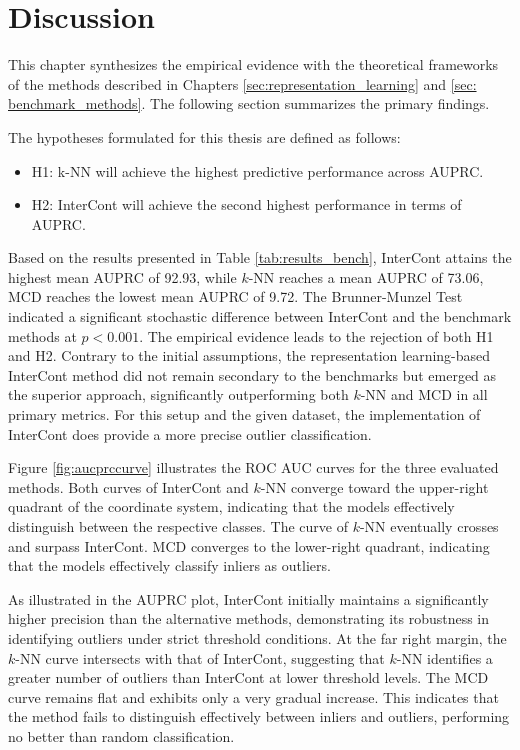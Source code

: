 \section{Discussion}\label{sec:discussion}
This chapter synthesizes the empirical evidence with the theoretical frameworks of the methods described in Chapters \ref{sec:representation_learning} and \ref{sec: benchmark_methods}. 
The following section summarizes the primary findings. 

The hypotheses formulated for this thesis are defined as follows:
\begin{itemize}
    \item H1: k-NN will achieve the highest predictive performance across AUPRC.
    \item H2: InterCont will achieve the second highest performance in terms of AUPRC.
\end{itemize}

Based on the results presented in Table \ref{tab:results_bench}, InterCont attains the highest mean AUPRC of 92.93, while $k$-NN reaches a mean AUPRC of 73.06, MCD reaches the lowest mean AUPRC of 9.72. 
The Brunner-Munzel Test indicated a significant stochastic difference between InterCont and the benchmark methods at $p < 0.001$. 
The empirical evidence leads to the rejection of both H1 and H2. 
Contrary to the initial assumptions, the representation learning-based InterCont method did not remain secondary to the benchmarks but emerged as the superior approach, significantly outperforming both $k$-NN and MCD in all primary metrics.
For this setup and the given dataset, the implementation of InterCont does provide a more precise outlier classification.


Figure \ref{fig:aucprccurve} illustrates the ROC AUC curves for the three evaluated methods. 
Both curves of InterCont and $k$-NN converge toward the upper-right quadrant of the coordinate system, indicating that the models effectively distinguish between the respective classes.
The curve of $k$-NN eventually crosses and surpass InterCont. 
MCD converges to the lower-right quadrant, indicating that the models effectively classify inliers as outliers.


As illustrated in the AUPRC plot, InterCont initially maintains a significantly higher precision than the alternative methods, demonstrating its robustness in identifying outliers under strict threshold conditions. 
At the far right margin, the $k$-NN curve intersects with that of InterCont, suggesting that $k$-NN identifies a greater number of outliers than InterCont at lower threshold levels. 
The MCD curve remains flat and exhibits only a very gradual increase. 
This indicates that the method fails to distinguish effectively between inliers and outliers, performing no better than random classification.


